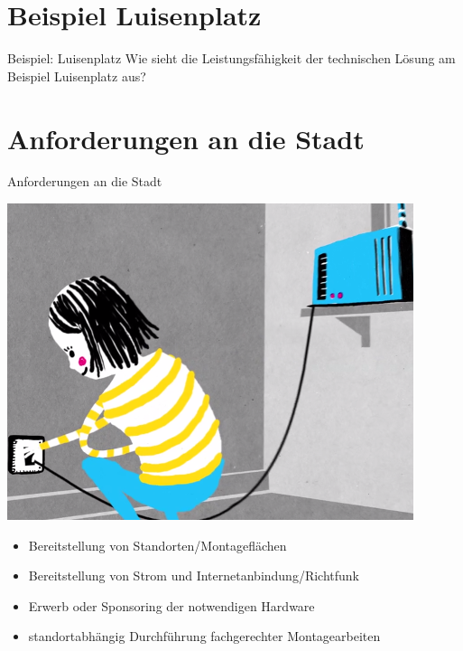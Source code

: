 \documentclass{beamer}
\begin{document}
\section{Beispiel Luisenplatz}
\begin{frame}{Beispiel: Luisenplatz}
Wie sieht die Leistungsfähigkeit der technischen Lösung am Beispiel Luisenplatz aus?
\end{frame}

\section{Anforderungen an die Stadt}
\begin{frame}{Anforderungen an die Stadt}
\vfill
\begin{center}
\includegraphics[height=0.4\textheight]{images/setup}$\;$
\vfill
\end{center}
\begin{itemize}
\item Bereitstellung von Standorten/Montageflächen
\item Bereitstellung von Strom und Internetanbindung/Richtfunk
\item Erwerb oder Sponsoring der notwendigen Hardware
\item standortabhängig Durchführung fachgerechter Montagearbeiten
\end{itemize}
\vfill
\end{frame}
\end{document}
